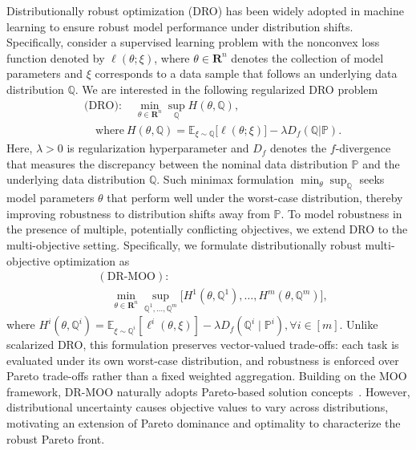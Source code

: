 \documentclass[twoside]{article} %
\theoremstyle{plain}
\theoremstyle{definition}
\theoremstyle{remark}
\begin{document}
Distributionally robust optimization (DRO) has been widely adopted in machine learning to ensure robust model performance under distribution shifts. Specifically, consider a supervised learning problem with the nonconvex loss function denoted by $\ell(\theta;\xi)$, where $\theta\in \mathbf{R}^n$ denotes the collection of model parameters and $\xi$ corresponds to a data sample that follows an underlying data distribution $\mathbb{Q}$. We are interested in the following regularized DRO problem
\begin{align}
  &\text{(DRO)}: \quad \min_{\theta \in \mathbf{R}^n} \sup_{\mathbb{Q}} H({\theta},\mathbb{Q}), \nonumber\\
  &\quad
   \text{where} ~ H({\theta},\mathbb{Q}) = \mathbb{E}_{\xi \sim \mathbb{Q}} \bigr [ \ell(\theta;\xi)\bigr] - \lambda D_f(\mathbb{Q} | \mathbb{P}).
    \label{primal1}
\end{align}
Here, $\lambda>0$ is regularization hyperparameter and $D_f$ denotes the $f$-divergence that measures the 
discrepancy between the nominal data distribution $\mathbb{P}$ and the underlying data distribution $\mathbb{Q}$. Such minimax formulation $\min_{\theta}\sup_{\mathbb{Q}}$
seeks model parameters $\theta$ that perform well under the worst-case distribution, thereby improving robustness to distribution shifts away from $\mathbb{P}$.
To model robustness in the presence of multiple, potentially conflicting objectives, we extend DRO to the multi-objective setting. Specifically, we formulate distributionally robust multi-objective optimization as
\begin{align}
   &(\text{DR-MOO}):\nonumber\\
   &\quad~\min_{{\theta} \in \mathbf{R}^n} \sup_{\mathbb{Q}^1,\ldots,\mathbb{Q}^m} 
   \big[ H^1({\theta},\mathbb{Q}^1), \ldots, H^m({\theta},\mathbb{Q}^m)\big],
\label{eq: primal DR-MOO}
\end{align}
where $H^i({\theta}, \mathbb{Q}^i)
=\mathbb{E}_{\xi\sim\mathbb{Q}^i}[\ell^i({\theta},\xi)]
-\lambda D_f(\mathbb{Q}^i\mid \mathbb{P}^i),\forall i\in[m]$.
Unlike scalarized DRO, this formulation preserves vector-valued trade-offs: each task is evaluated under its own worst-case distribution, and robustness is enforced over Pareto trade-offs rather than a fixed weighted aggregation. Building on the MOO framework, DR-MOO naturally adopts Pareto-based solution concepts~\citep{marucsciac1982fritz}. However, distributional uncertainty causes objective values to vary across distributions, motivating an extension of Pareto dominance and optimality to characterize the robust Pareto front.
\end{document}

